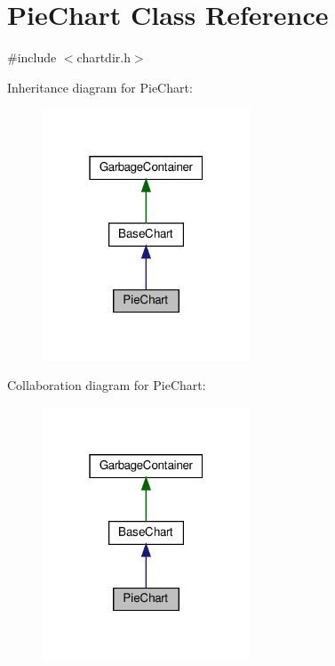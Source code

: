 \hypertarget{class_pie_chart}{}\section{Pie\+Chart Class Reference}
\label{class_pie_chart}


{\ttfamily \#include $<$chartdir.\+h$>$}



Inheritance diagram for Pie\+Chart\+:
\nopagebreak
\begin{figure}[H]
\begin{center}
\leavevmode
\includegraphics[width=175pt]{class_pie_chart__inherit__graph}
\end{center}
\end{figure}


Collaboration diagram for Pie\+Chart\+:
\nopagebreak
\begin{figure}[H]
\begin{center}
\leavevmode
\includegraphics[width=175pt]{class_pie_chart__coll__graph}
\end{center}
\end{figure}
